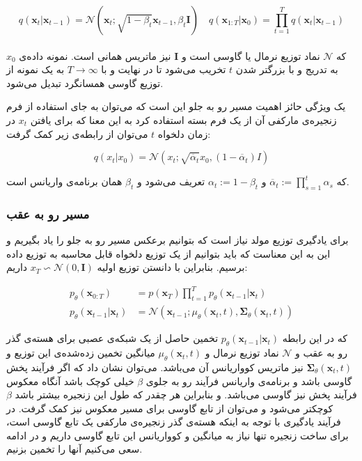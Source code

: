 \begin{equation}
	q(\mathbf{x}_t|\mathbf{x}_{t-1}) = \mathcal{N}(\mathbf{x}_t; \sqrt{1 - \beta_t}\mathbf{x}_{t-1}, \beta_t\mathbf{I}) \quad q(\mathbf{x}_{1:T}|\mathbf{x}_0) = \prod_{t=1}^T q(\mathbf{x}_t|\mathbf{x}_{t-1})
\end{equation}
\\
که $\mathcal{N}$ نماد توزیع نرمال یا گاوسی است و $\mathbf{I}$ نیز ماتریس همانی است. نمونه داده‌ی $x_0$ به تدریج و با بزرگتر شدن $t$ تخریب می‌شود تا در نهایت و با $T \to \infty$ به یک نمونه از توزیع گاوسی همسانگرد تبدیل می‌شود.

یک ویژگی حائز اهمیت مسیر رو به جلو این است که می‌توان به جای استفاده از فرم زنجیره‌ی مارکفی آن از یک فرم بسته استفاده کرد به این معنا که برای یافتن $x_t$ در زمان دلخواه $t$ می‌توان از رابطه‌ی زیر کمک گرفت:


\begin{equation}
q(x_t|x_0) = \mathcal{N}(x_t; \sqrt{\overline{\alpha}_t} x_0, (1 - \overline{\alpha}_t)I)
\end{equation}

که $ \overline{\alpha}_t := \prod_{s=1}^t \alpha_s$ و $ \alpha_t := 1 - \beta_t$  تعریف می‌شود و  $\beta_t$ همان برنامه‌ی واریانس است.

\subsubsection{مسیر رو به عقب}

برای یادگیری توزیع مولد نیاز است که بتوانیم برعکس مسیر رو به جلو را یاد بگیریم و این به این معناست که باید بتوانیم از یک توزیع دلخواه قابل محاسبه به توزیع داده برسیم. بنابراین با دانستن توزیع اولیه $x_T \backsim \mathcal{N}(0, \mathbf{I})$  داریم:



\begin{equation}
\label{ddpmf}
\begin{align*}
	p_{\theta}(\mathbf{x}_{0:T}) &= p(\mathbf{x}_{T}) \prod_{t=1}^{T} p_{\theta}(\mathbf{x}_{t-1}|\mathbf{x}_{t}) \\
	p_{\theta}(\mathbf{x}_{t-1}|\mathbf{x}_{t}) &= \mathcal{N}(\mathbf{x}_{t-1}; \mu_{\theta}(\mathbf{x}_{t}, t), \boldsymbol{\Sigma}_{\theta}(\mathbf{x}_{t}, t))
\end{align*}
\end{equation}

که در این رابطه $p_{\theta}(\mathbf{x}_{t-1}|\mathbf{x}_{t})$ تخمین حاصل از یک شبکه‌ی عصبی برای هسته‌ی گذر رو به عقب و $\mathcal{N}$ نماد توزیع نرمال و $\mu_{\theta}(\mathbf{x}_{t}, t)$ میانگین تخمین زده‌شده‌ی این توزیع و $\boldsymbol{\Sigma}_{\theta}(\mathbf{x}_{t}, t)$ نیز ماتریس کوواریانس آن می‌باشد. می‌توان نشان داد که اگر فرآیند پخش گاوسی باشد و برنامه‌ی واریانس فرآیند رو به جلوی  $\beta$ خیلی کوچک باشد آنگاه معکوس فرآیند پخش نیز گاوسی می‌باشد\cite{feller2015retracted}. و بنابراین هر چقدر که طول این زنجیره بیشتر باشد $\beta$ کوچکتر می‌شود و می‌توان از تابع گاوسی برای مسیر معکوس نیز کمک گرفت. در فرآیند یادگیری با توجه به اینکه هسته‌ی گذر زنجیره‌ی مارکفی یک تابع گاوسی است، برای ساخت زنجیره تنها نیاز به میانگین و کوواریانس این تابع گاوسی داریم و در ادامه سعی می‌کنیم آنها را تخمین بزنیم.


